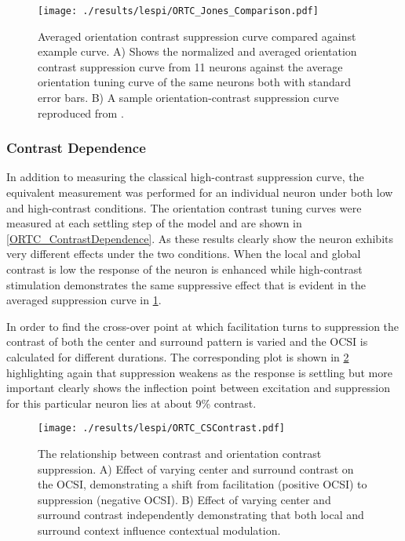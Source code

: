\begin{figure}
	\centering
        \texttt{[image: ./results/lespi/ORTC\_Jones\_Comparison.pdf]}
	\caption[Averaged orientation-contrast suppression curve compared
      against \cite{Jones2002} example curve.]{Averaged orientation
      contrast suppression curve compared against \cite{Jones2002}
      example curve. A) Shows the normalized and averaged orientation
      contrast suppression curve from 11 neurons against the average
      orientation tuning curve of the same neurons both with standard
      error bars. B) A sample orientation-contrast suppression curve
      reproduced from \cite{Jones2002}.}
	\label{ORTC_Jones}
\end{figure}

\subsubsection{Contrast Dependence}

In addition to measuring the classical high-contrast suppression
curve, the equivalent measurement was performed for an individual
neuron under both low and high-contrast conditions. The orientation
contrast tuning curves were measured at each settling step of the
model and are shown in \ref{ORTC_ContrastDependence}. As these results
clearly show the neuron exhibits very different effects under the two
conditions. When the local and global contrast is low the response of
the neuron is enhanced while high-contrast stimulation demonstrates
the same suppressive effect that is evident in the averaged
suppression curve in \ref{ORTC_Jones}.

In order to find the cross-over point at which facilitation turns to
suppression the contrast of both the center and surround pattern is
varied and the OCSI is calculated for different durations. The
corresponding plot is shown in \ref{ORTC_ContrastCurve} highlighting
again that suppression weakens as the response is settling but more
important clearly shows the inflection point between excitation and
suppression for this particular neuron lies at about 9\% contrast.

\begin{figure}
	\centering
        \texttt{[image: ./results/lespi/ORTC\_CSContrast.pdf]}
	\caption[Contrast dependent switch from facilitation to
      suppression.]{The relationship between contrast and orientation
      contrast suppression. A) Effect of varying center and surround
      contrast on the OCSI, demonstrating a shift from facilitation
      (positive OCSI) to suppression (negative OCSI). B) Effect of
      varying center and surround contrast independently demonstrating
      that both local and surround context influence contextual
      modulation.}
	\label{ORTC_ContrastCurve}
\end{figure}

